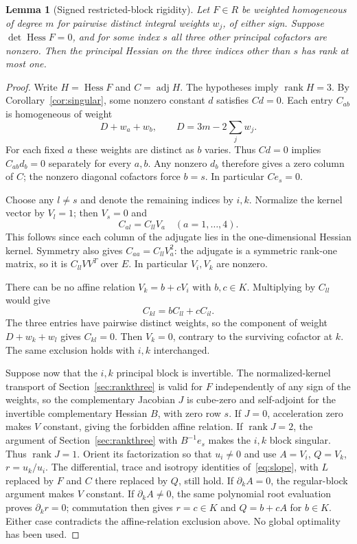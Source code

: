 \documentclass[11pt,a4paper]{article}
\newtheorem{lemma}[theorem]{Lemma}
\newcommand{\Hess}{\operatorname{Hess}}
\newcommand{\adj}{\operatorname{adj}}
\newcommand{\rank}{\operatorname{rank}}
\begin{document}
\begin{lemma}[Signed restricted-block rigidity]\label{lem:signed}
Let $F\in R$ be weighted homogeneous of degree $m$ for pairwise distinct integral weights $w_j$, of either sign. Suppose $\det\Hess F=0$, and for some index $s$ all three other principal cofactors are nonzero. Then the principal Hessian on the three indices other than $s$ has rank at most one.
\end{lemma}
\begin{proof}
Write $H=\Hess F$ and $C=\adj H$. The hypotheses imply $\rank H=3$. By Corollary~\ref{cor:singular}, some nonzero constant $d$ satisfies $Cd=0$. Each entry $C_{ab}$ is homogeneous of weight
\[
 D+w_a+w_b,\qquad D=3m-2\sum_j w_j.
\]
For each fixed $a$ these weights are distinct as $b$ varies. Thus $Cd=0$ implies $C_{ab}d_b=0$ separately for every $a,b$. Any nonzero $d_b$ therefore gives a zero column of $C$; the nonzero diagonal cofactors force $b=s$. In particular $Ce_s=0$.

Choose any $l\ne s$ and denote the remaining indices by $i,k$. Normalize the kernel vector by $V_l=1$; then $V_s=0$ and
\[
 C_{al}=C_{ll}V_a\quad(a=1,\ldots,4).
\]
This follows since each column of the adjugate lies in the one-dimensional Hessian kernel. Symmetry also gives $C_{aa}=C_{ll}V_a^2$: the adjugate is a symmetric rank-one matrix, so it is $C_{ll}VV^T$ over $E$. In particular $V_i,V_k$ are nonzero.

There can be no affine relation $V_k=b+cV_i$ with $b,c\in K$. Multiplying by $C_{ll}$ would give
\[
 C_{kl}=bC_{ll}+cC_{il}.
\]
The three entries have pairwise distinct weights, so the component of weight $D+w_k+w_l$ gives $C_{kl}=0$. Then $V_k=0$, contrary to the surviving cofactor at $k$. The same exclusion holds with $i,k$ interchanged.

Suppose now that the $i,k$ principal block is invertible. The normalized-kernel transport of Section~\ref{sec:rankthree} is valid for $F$ independently of any sign of the weights, so the complementary Jacobian $J$ is cube-zero and self-adjoint for the invertible complementary Hessian $B$, with zero row $s$.
If $J=0$, acceleration zero makes $V$ constant, giving the forbidden affine relation. If $\rank J=2$, the argument of Section~\ref{sec:rankthree} with $B^{-1}e_s$ makes the $i,k$ block singular. Thus $\rank J=1$. Orient its factorization so that $u_i\ne0$ and use $A=V_i$, $Q=V_k$, $r=u_k/u_i$. The differential, trace and isotropy identities of~\eqref{eq:slope}, with $L$ replaced by $F$ and $C$ there replaced by $Q$, still hold. If $\partial_k A=0$, the regular-block argument makes $V$ constant. If $\partial_k A\ne0$, the same polynomial root evaluation proves $\partial_k r=0$; commutation then gives $r=c\in K$ and $Q=b+cA$ for $b\in K$. Either case contradicts the affine-relation exclusion above. No global optimality has been used.


\end{proof}
\end{document}
